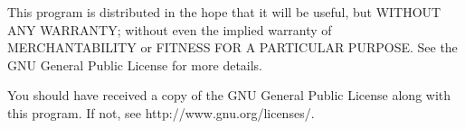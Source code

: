 \documentclass[a4paper,12pt]{amsart}
\begin{document}
This program is distributed in the hope that it will be useful, but WITHOUT ANY WARRANTY; without even the implied warranty of MERCHANTABILITY or FITNESS FOR A PARTICULAR PURPOSE.  See the GNU General Public License for more details.

You should have received a copy of the GNU General Public License along with this program.  If not, see http://www.gnu.org/licenses/.




\end{document}
